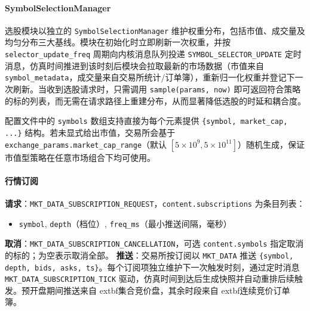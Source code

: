 \paragraph{SymbolSelectionManager}
选股模块以独立的 \verb|SymbolSelectionManager| 维护权重分布，包括市值、成交量及均匀分布三大基线。模块在初始化时立即刷新一次权重，并按 \verb|selector_update_freq| 周期向内核消息队列投递 \verb|SYMBOL_SELECTOR_UPDATE| 定时消息，仿真时间推进到该时刻后模块会拉取最新的市场数据（市值来自 \verb|symbol_metadata|，成交量来自交易所统计/订单簿），重新归一化权重并登记下一次刷新。当收到选股请求时，只需调用 \verb|sample(params, now)| 即可返回符合策略的标的列表，而无需在请求路径上重建分布，从而显著降低选股的时延和耦合度。

配置文件中的 \verb|symbols| 数组支持直接为每个元素提供 \verb|{symbol, market_cap, ...}| 结构。若未显式给出市值，交易所会基于 \verb|exchange_params.market_cap_range|（默认 $[5\times10^9, 5\times10^{11}]$）随机生成，保证市值型策略在任意市场组合下均可使用。

\paragraph{行情订阅}
\textbf{请求}：\verb|MKT_DATA_SUBSCRIPTION_REQUEST|，\verb|content.subscriptions| 为条目列表：
\begin{itemize}
  \item \texttt{symbol}, \texttt{depth}（档位）, \texttt{freq\_ms}（最小推送间隔，毫秒）
\end{itemize}
\textbf{取消}：\verb|MKT_DATA_SUBSCRIPTION_CANCELLATION|，可选 \verb|content.symbols| 指定取消的标的；为空表示取消全部。
\textbf{推送}：交易所按订阅以 \verb|MKT_DATA| 推送 \verb|{symbol, depth, bids, asks, ts}|。每个订阅项独立维护下一次触发时刻，通过定时消息 \verb|MKT_DATA_SUBSCRIPTION_TICK| 驱动，仿真时间到达后生成快照并自动重排后续触发。预开盘期间推送来自	extbf{集合竞价盘}，其余时段来自	extbf{连续竞价订单簿}。

